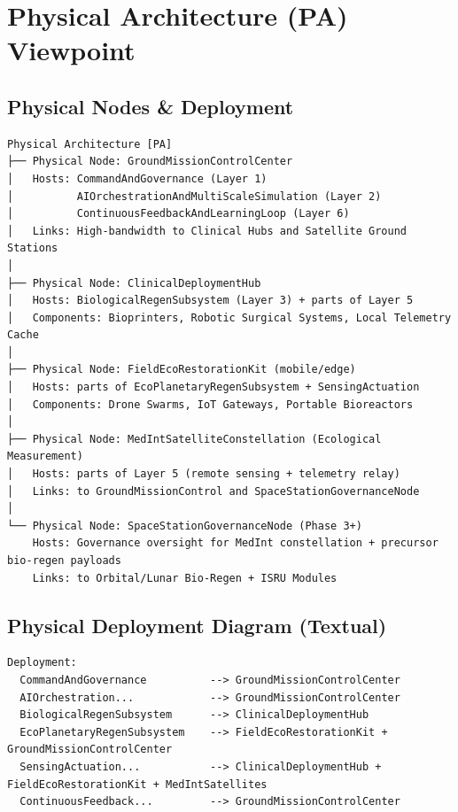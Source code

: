 \documentclass[11pt,a4paper]{report}
\begin{document}
\chapter{Physical Architecture (PA) Viewpoint}

\section{Physical Nodes \& Deployment}

\begin{lstlisting}[style=sysmlstyle, caption={Physical Architecture (PA) -- Nodes and Deployment}]
Physical Architecture [PA]
├── Physical Node: GroundMissionControlCenter
│   Hosts: CommandAndGovernance (Layer 1)
│          AIOrchestrationAndMultiScaleSimulation (Layer 2)
│          ContinuousFeedbackAndLearningLoop (Layer 6)
│   Links: High-bandwidth to Clinical Hubs and Satellite Ground Stations
│
├── Physical Node: ClinicalDeploymentHub
│   Hosts: BiologicalRegenSubsystem (Layer 3) + parts of Layer 5
│   Components: Bioprinters, Robotic Surgical Systems, Local Telemetry Cache
│
├── Physical Node: FieldEcoRestorationKit (mobile/edge)
│   Hosts: parts of EcoPlanetaryRegenSubsystem + SensingActuation
│   Components: Drone Swarms, IoT Gateways, Portable Bioreactors
│
├── Physical Node: MedIntSatelliteConstellation (Ecological Measurement)
│   Hosts: parts of Layer 5 (remote sensing + telemetry relay)
│   Links: to GroundMissionControl and SpaceStationGovernanceNode
│
└── Physical Node: SpaceStationGovernanceNode (Phase 3+)
    Hosts: Governance oversight for MedInt constellation + precursor bio-regen payloads
    Links: to Orbital/Lunar Bio-Regen + ISRU Modules
\end{lstlisting}

\section{Physical Deployment Diagram (Textual)}

\begin{lstlisting}[style=sysmlstyle, caption={Physical Deployment: URTE Components to Nodes}]
Deployment:
  CommandAndGovernance          --> GroundMissionControlCenter
  AIOrchestration...            --> GroundMissionControlCenter
  BiologicalRegenSubsystem      --> ClinicalDeploymentHub
  EcoPlanetaryRegenSubsystem    --> FieldEcoRestorationKit + GroundMissionControlCenter
  SensingActuation...           --> ClinicalDeploymentHub + FieldEcoRestorationKit + MedIntSatellites
  ContinuousFeedback...         --> GroundMissionControlCenter
\end{lstlisting}
\end{document}
